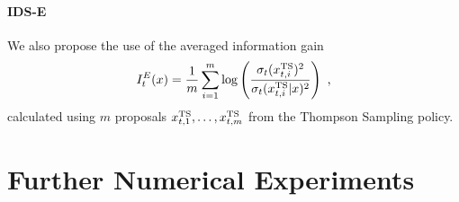 \paragraph{IDS-E}
We also propose the use of the averaged information gain
\begin{align*}
I_t^E(x) = \frac{1}{m} \sum_{i=1}^m \log\left(\frac{\sigma_t(x_{t,i}^{\text{TS}})^2}{\sigma_t(x_{t,i}^{\text{TS}}|x)^2}\right) \text{ ,}
\end{align*}
calculated using $m$ proposals $x_{t,1}^{\text{TS}}, \dots, x_{t,m}^{\text{TS}}$ from the Thompson Sampling policy.

\section{Further Numerical Experiments}\label{app: further experiments}

